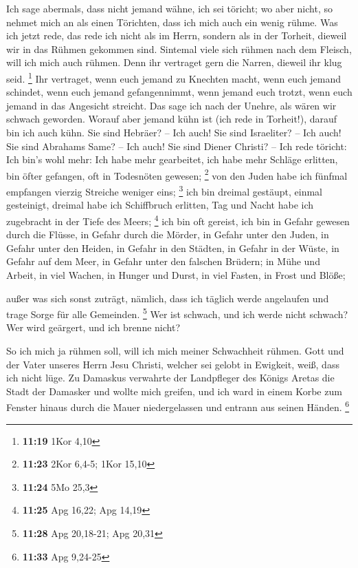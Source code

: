  Ich sage abermals, dass nicht jemand wähne, ich sei
töricht; wo aber nicht, so nehmet mich an als einen Törichten, dass ich
mich auch ein wenig rühme.  Was ich jetzt rede, das rede
ich nicht als im Herrn, sondern als in der Torheit, dieweil wir in das
Rühmen gekommen sind.  Sintemal viele sich rühmen nach
dem Fleisch, will ich mich auch rühmen.  Denn ihr
vertraget gern die Narren, dieweil ihr klug seid. \footnote{\textbf{11:19}
  1Kor 4,10}  Ihr vertraget, wenn euch jemand zu Knechten
macht, wenn euch jemand schindet, wenn euch jemand gefangennimmt, wenn
jemand euch trotzt, wenn euch jemand in das Angesicht streicht.
 Das sage ich nach der Unehre, als wären wir schwach
geworden. Worauf aber jemand kühn ist (ich rede in Torheit!), darauf bin
ich auch kühn.  Sie sind Hebräer? -- Ich auch! Sie sind
Israeliter? -- Ich auch! Sie sind Abrahams Same? -- Ich auch!
 Sie sind Diener Christi? -- Ich rede töricht: Ich bin's
wohl mehr: Ich habe mehr gearbeitet, ich habe mehr Schläge erlitten, bin
öfter gefangen, oft in Todesnöten gewesen; \footnote{\textbf{11:23} 2Kor
  6,4-5; 1Kor 15,10}  von den Juden habe ich fünfmal
empfangen vierzig Streiche weniger eins; \footnote{\textbf{11:24} 5Mo
  25,3}  ich bin dreimal gestäupt, einmal gesteinigt,
dreimal habe ich Schiffbruch erlitten, Tag und Nacht habe ich zugebracht
in der Tiefe des Meers; \footnote{\textbf{11:25} Apg 16,22; Apg 14,19}
 ich bin oft gereist, ich bin in Gefahr gewesen durch die
Flüsse, in Gefahr durch die Mörder, in Gefahr unter den Juden, in Gefahr
unter den Heiden, in Gefahr in den Städten, in Gefahr in der Wüste, in
Gefahr auf dem Meer, in Gefahr unter den falschen Brüdern;
 in Mühe und Arbeit, in viel Wachen, in Hunger und Durst,
in viel Fasten, in Frost und Blöße;

 außer was sich sonst zuträgt, nämlich, dass ich täglich
werde angelaufen und trage Sorge für alle Gemeinden. \footnote{\textbf{11:28}
  Apg 20,18-21; Apg 20,31}  Wer ist schwach, und ich
werde nicht schwach? Wer wird geärgert, und ich brenne nicht?

 So ich mich ja rühmen soll, will ich mich meiner
Schwachheit rühmen.  Gott und der Vater unseres Herrn
Jesu Christi, welcher sei gelobt in Ewigkeit, weiß, dass ich nicht lüge.
 Zu Damaskus verwahrte der Landpfleger des Königs Aretas
die Stadt der Damasker und wollte mich greifen,  und ich
ward in einem Korbe zum Fenster hinaus durch die Mauer niedergelassen
und entrann aus seinen Händen. \footnote{\textbf{11:33} Apg 9,24-25}

